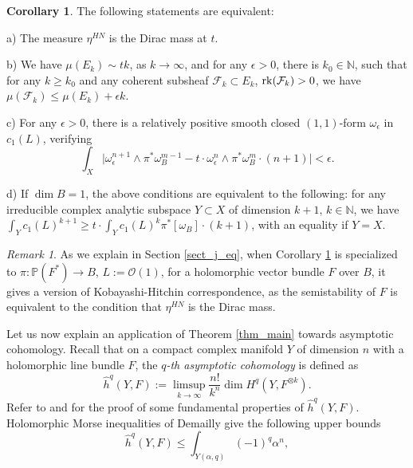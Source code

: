 \documentclass[12pt]{article}
\numberwithin{equation}{section}
\theoremstyle{theorem}
\theoremstyle{definition}
\newtheorem{cor}[thm]{Corollary}
\theoremstyle{remark}
\newtheorem{rem}[thm]{Remark}
\newcommand{\nat}{\mathbb{N}}
\newcommand{\rk}[1]{{\rm{rk}} ( #1 )}
\begin{document}
	\begin{cor}\label{cor_wzw}
		The following statements are equivalent:
		\par 
		a) The measure $\eta^{HN}$ is the Dirac mass at $t$.
		\par 
		b) We have $\mu(E_k) \sim t k$, as $k \to \infty$, and for any $\epsilon > 0$, there is $k_0 \in \nat$, such that for any $k \geq k_0$ and any coherent subsheaf $\mathcal{F}_k \subset E_k$, $\rk{\mathcal{F}_k} > 0$, we have $\mu(\mathcal{F}_k) \leq \mu(E_k) + \epsilon k$.
		\par 
		c) For any $\epsilon > 0$, there is a relatively positive smooth closed $(1, 1)$-form $\omega_{\epsilon}$ in $c_1(L)$, verifying
		\begin{equation}\label{eq_cor_wzw}
			\int_X \big| \omega_{\epsilon}^{n + 1} \wedge \pi^* \omega_B^{m - 1} - t \cdot \omega_{\epsilon}^{n} \wedge \pi^* \omega_B^{m} \cdot (n + 1) \big| < \epsilon.
		\end{equation}
		\par 
		d) 	If $\dim B = 1$, the above conditions are equivalent to the following: for any irreducible complex analytic subspace $Y \subset X$ of dimension $k + 1$, $k \in \nat$, we have 
	$\int_Y c_1(L)^{k + 1} \geq t \cdot \int_Y c_1(L)^k \pi^* [\omega_B] \cdot (k + 1)$, with an equality if $Y = X$.
	\end{cor}
	\begin{rem}
		As we explain in Section \ref{sect_j_eq}, when Corollary \ref{cor_wzw} is specialized to $\pi : \mathbb{P}(F^*) \to B$, $L := \mathscr{O}(1)$, for a holomorphic vector bundle $F$ over $B$, it gives a version of Kobayashi-Hitchin correspondence, as the semistability of $F$ is equivalent to the condition that $\eta^{HN}$ is the Dirac mass.
	\end{rem}
	\par 
	Let us now explain an application of Theorem \ref{thm_main} towards asymptotic cohomology.
	Recall that on a compact complex manifold $Y$ of dimension $n$ with a holomorphic line bundle $F$, the \textit{$q$-th asymptotic cohomology} is defined as
	\begin{equation}\label{defn_as_coh}
		\hat{h}^q(Y, F) := \limsup_{k \to \infty} \frac{n!}{k^n}	\dim H^q(Y, F^{\otimes k}).
	\end{equation}
	Refer to \cite{KuronyaAsymptCoh} and \cite{DemaillyRiemannHOLM} for the proof of some fundamental properties of $\hat{h}^q(Y, F)$. 
	Holomorphic Morse inequalities of Demailly \cite{Dem2} give the following upper bounds
	\begin{equation}\label{eq_holmi}
		\hat{h}^q(Y, F) \leq \int_{Y(\alpha, q)} (-1)^q \alpha^n,
	\end{equation}
\end{document}
